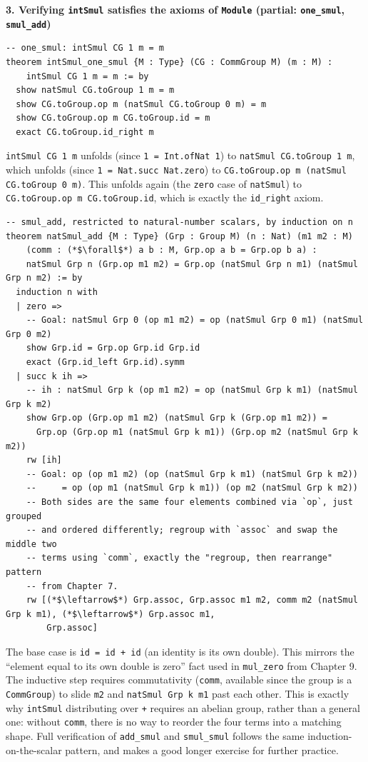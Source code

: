 \textbf{3. Verifying \texttt{intSmul} satisfies the axioms of \texttt{Module} (partial: \texttt{one\_\allowbreak{}smul}, \texttt{smul\_\allowbreak{}add})}

\begin{lstlisting}
-- one_smul: intSmul CG 1 m = m
theorem intSmul_one_smul {M : Type} (CG : CommGroup M) (m : M) :
    intSmul CG 1 m = m := by
  show natSmul CG.toGroup 1 m = m
  show CG.toGroup.op m (natSmul CG.toGroup 0 m) = m
  show CG.toGroup.op m CG.toGroup.id = m
  exact CG.toGroup.id_right m
\end{lstlisting}

\texttt{intSmul CG 1 m} unfolds (since \texttt{1 = Int.ofNat 1}) to \texttt{natSmul CG.toGroup 1 m}, which unfolds (since \texttt{1 = Nat.succ Nat.zero}) to \texttt{CG.toGroup.op m (natSmul CG.toGroup 0 m)}. This unfolds again (the \texttt{zero} case of \texttt{natSmul}) to \texttt{CG.toGroup.op m CG.toGroup.id}, which is exactly the \texttt{id\_\allowbreak{}right} axiom.

\begin{lstlisting}
-- smul_add, restricted to natural-number scalars, by induction on n
theorem natSmul_add {M : Type} (Grp : Group M) (n : Nat) (m1 m2 : M)
    (comm : (*$\forall$*) a b : M, Grp.op a b = Grp.op b a) :
    natSmul Grp n (Grp.op m1 m2) = Grp.op (natSmul Grp n m1) (natSmul Grp n m2) := by
  induction n with
  | zero =>
    -- Goal: natSmul Grp 0 (op m1 m2) = op (natSmul Grp 0 m1) (natSmul Grp 0 m2)
    show Grp.id = Grp.op Grp.id Grp.id
    exact (Grp.id_left Grp.id).symm
  | succ k ih =>
    -- ih : natSmul Grp k (op m1 m2) = op (natSmul Grp k m1) (natSmul Grp k m2)
    show Grp.op (Grp.op m1 m2) (natSmul Grp k (Grp.op m1 m2)) =
      Grp.op (Grp.op m1 (natSmul Grp k m1)) (Grp.op m2 (natSmul Grp k m2))
    rw [ih]
    -- Goal: op (op m1 m2) (op (natSmul Grp k m1) (natSmul Grp k m2))
    --     = op (op m1 (natSmul Grp k m1)) (op m2 (natSmul Grp k m2))
    -- Both sides are the same four elements combined via `op`, just grouped
    -- and ordered differently; regroup with `assoc` and swap the middle two
    -- terms using `comm`, exactly the "regroup, then rearrange" pattern
    -- from Chapter 7.
    rw [(*$\leftarrow$*) Grp.assoc, Grp.assoc m1 m2, comm m2 (natSmul Grp k m1), (*$\leftarrow$*) Grp.assoc m1,
        Grp.assoc]
\end{lstlisting}

The base case is \texttt{id = id + id} (an identity is its own double). This mirrors the ``element equal to its own double is zero'' fact used in \texttt{mul\_\allowbreak{}zero} from Chapter 9. The inductive step requires commutativity (\texttt{comm}, available since the group is a \texttt{CommGroup}) to slide \texttt{m2} and \texttt{natSmul Grp k m1} past each other. This is exactly why \texttt{intSmul} distributing over \texttt{+} requires an abelian group, rather than a general one: without \texttt{comm}, there is no way to reorder the four terms into a matching shape. Full verification of \texttt{add\_\allowbreak{}smul} and \texttt{smul\_\allowbreak{}smul} follows the same induction-on-the-scalar pattern, and makes a good longer exercise for further practice.

